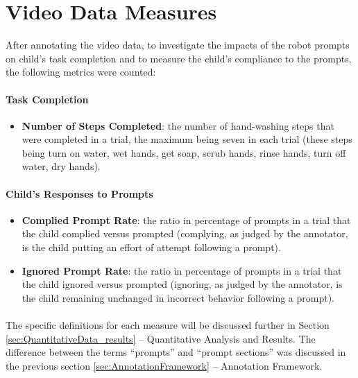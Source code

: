 \section{Video Data Measures}
\label{sec:measures}
After annotating the video data, to investigate the impacts of the robot prompts on child's task completion and to measure the child's compliance to the prompts, the following metrics were counted:

\paragraph{Task Completion}
\begin{itemize}
	\item \textbf{Number of Steps Completed}: the number of hand-washing steps that were completed in a trial, the maximum being seven in each trial (these steps being turn on water, wet hands, get soap, scrub hands, rinse hands, turn off water, dry hands).
\end{itemize}

\paragraph{Child's Responses to Prompts}
\begin{itemize}
	\item \textbf{Complied Prompt Rate}: the ratio in percentage of prompts in a trial that the child complied versus prompted (complying, as judged by the annotator, is the child putting an effort of attempt following a prompt).
	\item \textbf{Ignored Prompt Rate}: the ratio in percentage of prompts in a trial that the child ignored versus prompted (ignoring, as judged by the annotator, is the child remaining unchanged in incorrect behavior following a prompt).
\end{itemize}


\paragraph{} %
The specific definitions for each measure will be discussed further in Section \ref{sec:QuantitativeData_results} -- Quantitative Analysis and Results.  The difference between the terms ``prompts'' and ``prompt sections'' was discussed in the previous section \ref{sec:AnnotationFramework} -- Annotation Framework.